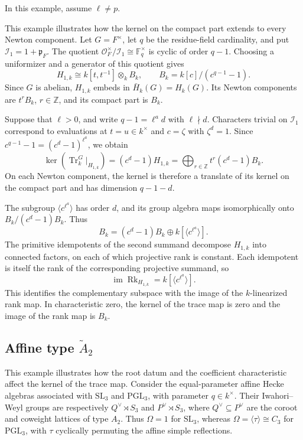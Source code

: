 \documentclass[11pt,letterpaper]{amsart}
\theoremstyle{definition}
\numberwithin{equation}{section}
\numberwithin{theorem}{section}
\newcommand{\kk}{k}
\newcommand{\ZZ}{\mathbb Z}
\newcommand{\CI}{\mathcal I}
\DeclareMathOperator{\Tr}{Tr}
\DeclareMathOperator{\Rk}{Rk}
\DeclareMathOperator{\im}{im}
\begin{document}
In this example, assume $\ell\ne p$.

This example illustrates how the kernel on the
compact part extends to every Newton component.
Let $G=F^\times$, let $q$ be the residue-field
cardinality, and put $\CI_1=1+\mathfrak p_F$.
The quotient
$\mathcal O_F^\times/\CI_1\cong\mathbb F_q^\times$
is cyclic of order $q-1$.
Choosing a uniformizer and a generator of this
quotient gives
\[
 H_{1,\kk}\cong\kk[t,t^{-1}]\otimes_\kk B_\kk,
 \qquad B_\kk=\kk[c]/(c^{q-1}-1).
\]
Since $G$ is abelian, $H_{1,\kk}$ embeds in
$\bar H_\kk(G)=H_\kk(G)$.
Its Newton components are $t^rB_\kk$, $r\in\ZZ$,
and its compact part is $B_\kk$.

Suppose that $\ell>0$, and write $q-1=\ell^a d$
with $\ell\nmid d$.
Characters trivial on $\CI_1$ correspond to
evaluations at $t=u\in\kk^\times$ and $c=\zeta$
with $\zeta^d=1$.
Since $c^{q-1}-1=(c^d-1)^{\ell^a}$, we obtain
\[
 \ker(\Tr_\kk^G|_{H_{1,\kk}})
   =(c^d-1)H_{1,\kk}
   =\bigoplus_{r\in\ZZ}t^r(c^d-1)B_\kk.
\]
On each Newton component, the kernel is therefore
a translate of its kernel on the compact part
and has dimension $q-1-d$.

The subgroup $\langle c^{\ell^a}\rangle$ has order
$d$, and its group algebra maps isomorphically
onto $B_\kk/(c^d-1)B_\kk$.
Thus
\[
 B_\kk=(c^d-1)B_\kk
       \oplus\kk[\langle c^{\ell^a}\rangle].
\]
The primitive idempotents of the second summand
decompose $H_{1,\kk}$ into connected factors,
on each of which projective rank is constant.
Each idempotent is itself the rank of the
corresponding projective summand, so
\[
 \im\Rk_{H_{1,\kk}}
   =\kk[\langle c^{\ell^a}\rangle].
\]
This identifies the complementary subspace with
the image of the $\kk$-linearized rank map.
In characteristic zero, the kernel of the trace
map is zero and the image of the rank map is $B_\kk$.

\subsection{Affine type \texorpdfstring{$\widetilde A_2$}{A2}}
\label{subsec:affine-rank-two}

This example illustrates how the root datum and
the coefficient characteristic affect the kernel
of the trace map.
Consider the equal-parameter affine Hecke algebras
associated with $\mathrm{SL}_3$ and $\mathrm{PGL}_3$,
with parameter $q\in\kk^\times$.
Their Iwahori--Weyl groups are respectively
$Q^\vee\rtimes S_3$ and $P^\vee\rtimes S_3$,
where $Q^\vee\subseteq P^\vee$ are the coroot
and coweight lattices of type $A_2$.
Thus $\Omega=1$ for $\mathrm{SL}_3$, whereas
$\Omega=\langle\tau\rangle\cong C_3$ for
$\mathrm{PGL}_3$, with $\tau$ cyclically permuting
the affine simple reflections.
\end{document}
